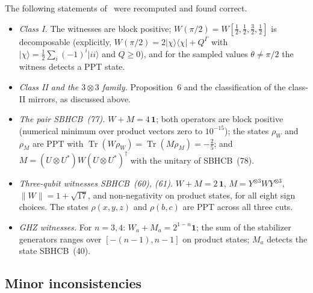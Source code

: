 \documentclass[11pt,a4paper]{article}
\theoremstyle{remark}
\newcommand{\ket}[1]{\lvert #1\rangle}
\newcommand{\ketbra}[2]{\lvert #1\rangle\langle #2\rvert}
\newcommand{\id}{\mathbf{1}}
\newcommand{\tr}{\operatorname{Tr}}
\newcommand{\G}{\Gamma}
\begin{document}
The following statements of~\cite{SBHCB26} were recomputed and found correct.
\begin{itemize}
\item \emph{Class I.} The witnesses are block positive; $W(\pi/2)=W[\tfrac12,\tfrac12,\tfrac32,\tfrac12]$
is decomposable (explicitly, $W(\pi/2)=2\ketbra{\chi}{\chi}+Q^{\G}$ with
$\ket\chi=\tfrac12\sum_i(-1)^i\ket{ii}$ and $Q\ge0$), and for the sampled values
$\theta\neq\pi/2$ the witness detects a PPT state.
\item \emph{Class II and the $3\otimes3$ family.} Proposition~6 and the classification of
the class-II mirrors, as discussed above.
\item \emph{The pair SBHCB~(77).} $W+M=4\,\id$; both operators are block positive
(numerical minimum over product vectors zero to $10^{-15}$); the states $\rho_W$ and
$\rho_M$ are PPT with $\tr(W\rho_W)=\tr(M\rho_M)=-\tfrac25$; and
$M=(U\otimes U^{*})W(U\otimes U^{*})^{\dagger}$ with the unitary of SBHCB~(78).
\item \emph{Three-qubit witnesses SBHCB~(60), (61).} $W+M=2\,\id$,
$M=Y^{\otimes3}WY^{\otimes3}$, $\|W\|=1+\sqrt{17}$, and non-negativity on product states,
for all eight sign choices. The states $\rho(x,y,z)$ and $\rho(b,c)$ are PPT across all
three cuts.
\item \emph{GHZ witnesses.} For $n=3,4$: $W_a+M_a=2^{1-n}\id$; the sum of the stabilizer
generators ranges over $[-(n-1),n-1]$ on product states; $M_a$ detects the state
SBHCB~(40).
\end{itemize}

\subsection{Minor inconsistencies}
\end{document}
